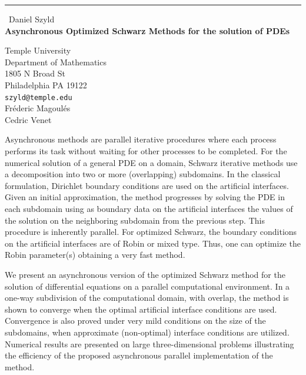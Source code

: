 \documentclass{report}
\begin{document}
\begin{center}
\rule{6in}{1pt} \
{\large Daniel Szyld \\
{\bf Asynchronous Optimized Schwarz Methods for the solution of PDEs}}

Temple University \\ Department of Mathematics \\ 1805 N Broad St \\ Philadelphia PA 19122
\\
{\tt szyld@temple.edu}\\
Fr\'ederic Magoul\'es\\
Cedric Venet\end{center}

Asynchronous methods are parallel iterative procedures where each process
performs its task without waiting for other processes to be completed.
For the numerical solution of a general PDE on a domain,
Schwarz iterative methods use a decomposition
into two or more (overlapping) subdomains.
In the classical formulation, Dirichlet boundary conditions are used
on the artificial interfaces.
Given an initial approximation, the method
progresses by solving the PDE in
each subdomain using as boundary data on the artificial interfaces
the values of the solution on the neighboring subdomain from the previous step.
This procedure is inherently parallel.
For optimized Schwarz, the boundary conditions on the artificial interfaces are
of Robin or mixed type.
Thus, one can optimize the Robin parameter(s) obtaining a very fast method.

We present an asynchronous version of the optimized Schwarz method
for the solution of differential equations on a parallel computational environment.
In a one-way subdivision of the computational domain, with overlap,
the method is shown to converge
when the optimal artificial interface conditions are used.
Convergence is also proved under very mild conditions on the size of the subdomains,
when approximate (non-optimal) interface conditions are utilized.
Numerical results are presented on large three-dimensional problems
illustrating the efficiency of the proposed
asynchronous parallel implementation of the method.
\end{document}
